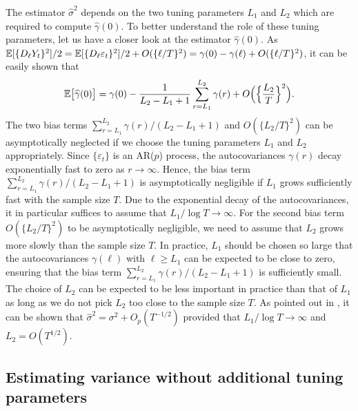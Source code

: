 The estimator $\widehat{\sigma}^2$ depends on the two tuning parameters $L_1$ and $L_2$ which are required to compute $\widehat{\gamma}(0)$. To better understand the role of these tuning parameters, let us have a closer look at the estimator $\widehat{\gamma}(0)$. As $\mathbb{E}[ \{ D_\ell Y_t \}^2 ]/2 = \mathbb{E}[ \{ D_\ell \varepsilon_t \}^2 ]/2 + O( \{\ell/T\}^2 ) = \gamma(0) - \gamma(\ell) + O( \{\ell/T\}^2 )$, it can be easily shown that
\[ \mathbb{E}\big[\widehat{\gamma}(0)\big] = \gamma(0) - \frac{1}{L_2-L_1+1}\sum_{r=L_1}^{L_2} \gamma(r) + O\Big( \Big\{\frac{L_2}{T} \Big\}^2 \Big). \]
The two bias terms $\sum_{r=L_1}^{L_2} \gamma(r) / (L_2-L_1+1)$ and $O(\{ L_2/T \}^2)$ can be asymptotically neglected if we choose the tuning parameters $L_1$ and $L_2$ appropriately. Since $\{ \varepsilon_t\}$ is an AR($p$) process, the autocovariances $\gamma(r)$ decay exponentially fast to zero as $r \rightarrow \infty$. Hence, the bias term $\sum_{r=L_1}^{L_2} \gamma(r) / (L_2-L_1+1)$ is asymptotically negligible if $L_1$ grows sufficiently fast with the sample size $T$. Due to the exponential decay of the autocovariances, it in particular suffices to assume that $L_1/\log T \rightarrow \infty$. For the second bias term  $O(\{ L_2/T \}^2)$ to be asymptotically negligible, we need to assume that $L_2$ grows more slowly than the sample size $T$. In practice, $L_1$ should be chosen so large that the autocovariances $\gamma(\ell)$ with $\ell \ge L_1$ can be expected to be close to zero, ensuring that the bias term $\sum_{r=L_1}^{L_2} \gamma(r) / (L_2-L_1+1)$ is sufficiently small. The choice of $L_2$ can be expected to be less important in practice than that of $L_1$ as long as we do not pick $L_2$ too close to the sample size $T$. As pointed out in \cite{Hall2003}, it can be shown that $\widehat{\sigma}^2 = \sigma^2 + O_p(T^{-1/2})$ provided that $L_1/\log T \rightarrow \infty$ and $L_2 = O(T^{1/2})$. 

\subsection{Estimating variance without additional tuning parameters}\label{subsec-error-var-ar-ours}


